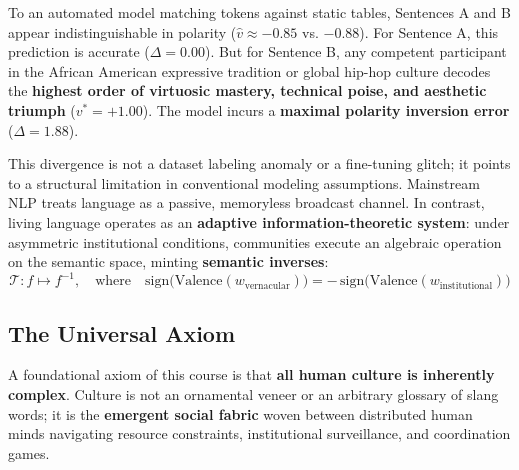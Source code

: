\documentclass[11pt,letterpaper]{article}
\begin{document}
To an automated model matching tokens against static tables, Sentences A and B appear indistinguishable in polarity ($\hat{v} \approx -0.85$ vs. $-0.88$). For Sentence A, this prediction is accurate ($\Delta = 0.00$). But for Sentence B, any competent participant in the African American expressive tradition or global hip-hop culture decodes the \textbf{highest order of virtuosic mastery, technical poise, and aesthetic triumph} ($v^* = +1.00$). The model incurs a \textbf{maximal polarity inversion error} ($\Delta = 1.88$).

This divergence is not a dataset labeling anomaly or a fine-tuning glitch; it points to a structural limitation in conventional modeling assumptions. Mainstream NLP treats language as a passive, memoryless broadcast channel. In contrast, living language operates as an \textbf{adaptive information-theoretic system}: under asymmetric institutional conditions, communities execute an algebraic operation on the semantic space, minting \textbf{semantic inverses}:
\begin{equation}
    \mathcal{T}: f \mapsto f^{-1}, \quad \text{where} \quad \text{sign}\big(\text{Valence}(w_{\text{vernacular}})\big) = -\,\text{sign}\big(\text{Valence}(w_{\text{institutional}})\big)
\end{equation}

\subsection{The Universal Axiom}
A foundational axiom of this course is that \textbf{all human culture is inherently complex}. Culture is not an ornamental veneer or an arbitrary glossary of slang words; it is the \textbf{emergent social fabric} woven between distributed human minds navigating resource constraints, institutional surveillance, and coordination games.
\end{document}
